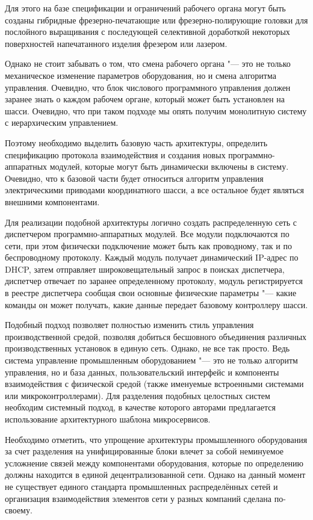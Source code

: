 Для этого на базе спецификации и ограничений рабочего органа могут быть созданы гибридные фрезерно-печатающие или фрезерно-полирующие головки  для послойного выращивания с последующей селективной доработкой некоторых поверхностей напечатанного изделия фрезером или лазером.

Однако не стоит забывать о том, что смена рабочего органа "--- это не только механическое изменение параметров оборудования, но и смена алгоритма управления. Очевидно, что блок числового программного управления должен заранее знать о каждом рабочем органе, который может быть установлен на шасси. Очевидно, что при таком подходе мы опять получим монолитную систему с иерархическим управлением.

Поэтому необходимо выделить базовую часть архитектуры, определить спецификацию протокола взаимодействия и создания новых программно-аппаратных модулей, которые могут быть динамически включены в систему. Очевидно, что к базовой части будет относиться алгоритм управления электрическими приводами координатного шасси, а все остальное будет являться внешними компонентами.

Для реализации подобной архитектуры логично создать распределенную сеть с диспетчером программно-аппаратных модулей. Все модули подключаются по сети, при этом физически подключение может быть как проводному, так и по беспроводному протоколу. Каждый модуль получает динамический IP-адрес по DHCP, затем отправляет широковещательный запрос в поисках диспетчера, диспетчер отвечает по заранее определенному протоколу, модуль регистрируется в реестре диспетчера сообщая свои основные физические параметры "--- какие команды он может получать, какие данные передает базовому контроллеру шасси.

Подобный подход позволяет полностью изменить стиль управления производственной средой, позволяя добиться бесшовного объединения различных производственных установок в единую сеть. Однако, не все так просто. Ведь система управление промышленным оборудованием "--- это не только алгоритм управления, но и база данных, пользовательский интерфейс и компоненты взаимодействия с физической средой (также именуемые встроенными системами или микроконтроллерами). Для разделения подобных целостных систем необходим системный подход, в качестве которого авторами предлагается использование архитектурного шаблона микросервисов.

Необходимо отметить, что упрощение архитектуры промышленного оборудования за счет разделения на унифицированные блоки влечет за собой неминуемое усложнение связей между компонентами оборудования, которые по определению должны находится в единой децентрализованной сети.  Однако на данный момент не существует единого стандарта промышленных распределённых сетей и организация взаимодействия элементов сети у разных компаний сделана по-своему.

